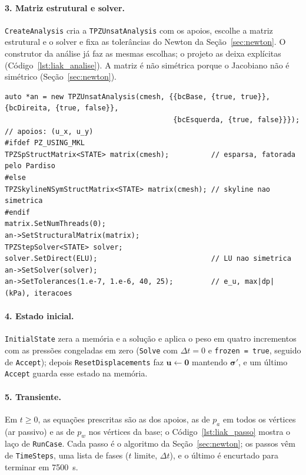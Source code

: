 \documentclass[11pt,a4paper]{article}
\newcommand{\vu}{\bm u}
\newcommand{\tsig}{\bm\sigma}
\begin{document}
\paragraph{3. Matriz estrutural e solver.} \texttt{CreateAnalysis} cria a \texttt{TPZUnsatAnalysis}
com os apoios, escolhe a matriz estrutural e o solver e fixa as tolerâncias do Newton da
Seção~\ref{sec:newton}. O construtor da análise já faz as mesmas escolhas; o projeto as deixa
explícitas (Código~\ref{lst:liak_analise}). A matriz é não simétrica porque o Jacobiano não é
simétrico (Seção~\ref{sec:newton}).

\begin{lstlisting}[style=neopz,caption={Matriz estrutural e solver (\texttt{CreateAnalysis}).},
                   label={lst:liak_analise}]
auto *an = new TPZUnsatAnalysis(cmesh, {{bcBase, {true, true}}, {bcDireita, {true, false}},
                                        {bcEsquerda, {true, false}}}); // apoios: (u_x, u_y)
#ifdef PZ_USING_MKL
TPZSpStructMatrix<STATE> matrix(cmesh);          // esparsa, fatorada pelo Pardiso
#else
TPZSkylineNSymStructMatrix<STATE> matrix(cmesh); // skyline nao simetrica
#endif
matrix.SetNumThreads(0);
an->SetStructuralMatrix(matrix);
TPZStepSolver<STATE> solver;
solver.SetDirect(ELU);                           // LU nao simetrica
an->SetSolver(solver);
an->SetTolerances(1.e-7, 1.e-6, 40, 25);         // e_u, max|dp| (kPa), iteracoes
\end{lstlisting}

\paragraph{4. Estado inicial.} \texttt{InitialState} zera a memória e a solução e aplica o peso em
quatro incrementos com as pressões congeladas em zero (\texttt{Solve} com $\Delta t=0$ e
\texttt{frozen = true}, seguido de \texttt{Accept}); depois \texttt{ResetDisplacements} faz
$\vu\leftarrow\bm 0$ mantendo $\tsig'$, e um último \texttt{Accept} guarda esse estado na memória.

\paragraph{5. Transiente.} Em $t\ge0$, as equações prescritas são as dos apoios, as de $p_a$ em
todos os vértices (ar passivo) e as de $p_w$ nos vértices da base; o Código~\ref{lst:liak_passo}
mostra o laço de \texttt{RunCase}. Cada passo é o algoritmo da Seção~\ref{sec:newton}; os passos
vêm de \texttt{TimeSteps}, uma lista de fases ($t$ limite, $\Delta t$), e o último é encurtado
para terminar em 7500~s.
\end{document}
